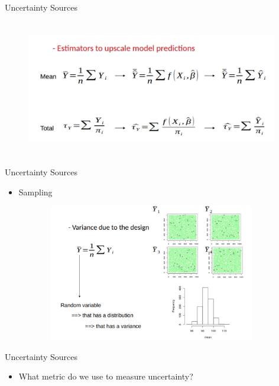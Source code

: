 \documentclass{beamer}
\begin{document}
\begin{frame} {Uncertainty Sources} 
\begin{figure}
        \centering
        \includegraphics[width = 11cm, height = 6cm]{pic/meanandtotal.jpg}
        \end{figure} 
\end{frame}


\begin{frame} {Uncertainty Sources} 
\begin{itemize}
    \item Sampling
    \end{itemize}
\begin{figure}
        \centering
        \includegraphics[width = 11cm, height = 6cm]{pic/varinv.png}
        \end{figure} 
\end{frame}

\begin{frame} {Uncertainty Sources} 
\begin{itemize}
    \item What metric do we use to measure uncertainty?
    \end{itemize}
\end{frame}
\end{document}
